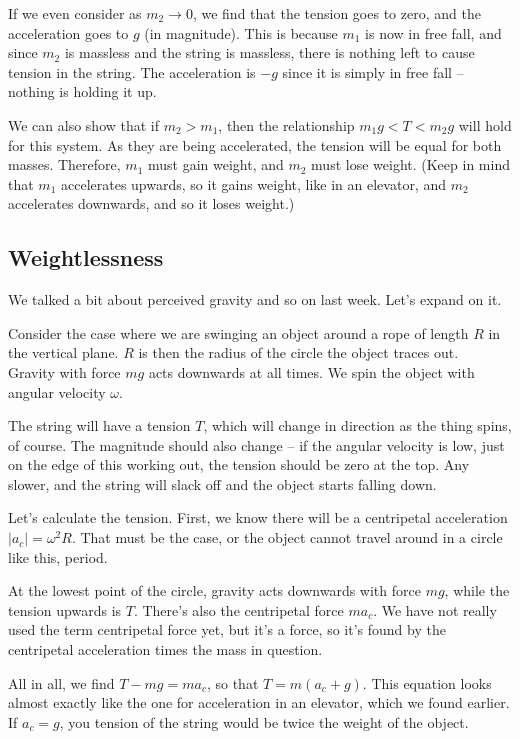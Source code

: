 \documentclass[12pt,a4paper]{report}
\begin{document}
If we even consider as $m_2 \to 0$, we find that the tension goes to zero, and the acceleration goes to $g$ (in magnitude). This is because $m_1$ is now in free fall, and since $m_2$ is massless and the string is massless, there is nothing left to cause tension in the string. The acceleration is $-g$ since it is simply in free fall -- nothing is holding it up.

We can also show that if $m_2 > m_1$, then the relationship $m_1 g < T < m_2 g$ will hold for this system. As they are being accelerated, the tension will be equal for both masses. Therefore, $m_1$ must gain weight, and $m_2$ must lose weight. (Keep in mind that $m_1$ accelerates upwards, so it gains weight, like in an elevator, and $m_2$ accelerates downwards, and so it loses weight.)

\subsection{Weightlessness}

We talked a bit about perceived gravity and so on last week. Let's expand on it.

Consider the case where we are swinging an object around a rope of length $R$ in the vertical plane. $R$ is then the radius of the circle the object traces out.\\
Gravity with force $m g$ acts downwards at all times. We spin the object with angular velocity $\omega$.

The string will have a tension $T$, which will change in direction as the thing spins, of course. The magnitude should also change -- if the angular velocity is low, just on the edge of this working out, the tension should be zero at the top. Any slower, and the string will slack off and the object starts falling down.

Let's calculate the tension. First, we know there will be a centripetal acceleration $|a_c| = \omega^2 R$. That must be the case, or the object cannot travel around in a circle like this, period.

At the lowest point of the circle, gravity acts downwards with force $m g$, while the tension upwards is $T$. There's also the centripetal force $m a_c$. We have not really used the term centripetal force yet, but it's a force, so it's found by the centripetal acceleration times the mass in question.

All in all, we find $T - mg = m a_c$, so that $T = m(a_c + g)$. This equation looks almost exactly like the one for acceleration in an elevator, which we found earlier. If $a_c = g$, you tension of the string would be twice the weight of the object.
\end{document}
